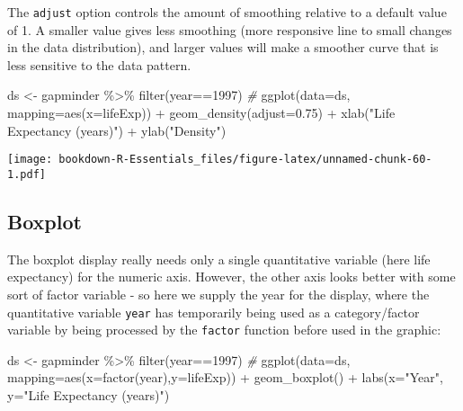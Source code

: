 \documentclass[
]{book}
\newenvironment{Shaded}{\begin{snugshade}}{\end{snugshade}}
\newcommand{\AttributeTok}[1]{\textcolor[rgb]{0.77,0.63,0.00}{#1}}
\newcommand{\CommentTok}[1]{\textcolor[rgb]{0.56,0.35,0.01}{\textit{#1}}}
\newcommand{\DecValTok}[1]{\textcolor[rgb]{0.00,0.00,0.81}{#1}}
\newcommand{\FloatTok}[1]{\textcolor[rgb]{0.00,0.00,0.81}{#1}}
\newcommand{\FunctionTok}[1]{\textcolor[rgb]{0.00,0.00,0.00}{#1}}
\newcommand{\NormalTok}[1]{#1}
\newcommand{\OtherTok}[1]{\textcolor[rgb]{0.56,0.35,0.01}{#1}}
\newcommand{\SpecialCharTok}[1]{\textcolor[rgb]{0.00,0.00,0.00}{#1}}
\newcommand{\StringTok}[1]{\textcolor[rgb]{0.31,0.60,0.02}{#1}}
\begin{document}
The \texttt{adjust} option controls the amount of smoothing relative to a default value of 1. A smaller value gives less smoothing (more responsive line to small changes in the data distribution), and larger values will make a smoother curve that is less sensitive to the data pattern.

\begin{Shaded}
\begin{Highlighting}[]
\NormalTok{ds }\OtherTok{\textless{}{-}}\NormalTok{ gapminder }\SpecialCharTok{\%\textgreater{}\%} 
  \FunctionTok{filter}\NormalTok{(year}\SpecialCharTok{==}\DecValTok{1997}\NormalTok{)}
\CommentTok{\#}
\FunctionTok{ggplot}\NormalTok{(}\AttributeTok{data=}\NormalTok{ds, }\AttributeTok{mapping=}\FunctionTok{aes}\NormalTok{(}\AttributeTok{x=}\NormalTok{lifeExp)) }\SpecialCharTok{+} 
  \FunctionTok{geom\_density}\NormalTok{(}\AttributeTok{adjust=}\FloatTok{0.75}\NormalTok{) }\SpecialCharTok{+} 
  \FunctionTok{xlab}\NormalTok{(}\StringTok{"Life Expectancy (years)"}\NormalTok{) }\SpecialCharTok{+}
  \FunctionTok{ylab}\NormalTok{(}\StringTok{"Density"}\NormalTok{)}
\end{Highlighting}
\end{Shaded}

\texttt{[image: bookdown-R-Essentials\_files/figure-latex/unnamed-chunk-60-1.pdf]}

\hypertarget{boxplot}{%
\subsection{Boxplot}\label{boxplot}}

The boxplot display really needs only a single quantitative variable (here life expectancy) for the numeric axis. However, the other axis looks better with some
sort of factor variable - so here we supply the year for the display, where the quantitative variable \texttt{year} has temporarily being used as a category/factor variable by being processed by the \texttt{factor} function before used in the graphic:

\begin{Shaded}
\begin{Highlighting}[]
\NormalTok{ds }\OtherTok{\textless{}{-}}\NormalTok{ gapminder }\SpecialCharTok{\%\textgreater{}\%} \FunctionTok{filter}\NormalTok{(year}\SpecialCharTok{==}\DecValTok{1997}\NormalTok{) }
\CommentTok{\#}
\FunctionTok{ggplot}\NormalTok{(}\AttributeTok{data=}\NormalTok{ds, }\AttributeTok{mapping=}\FunctionTok{aes}\NormalTok{(}\AttributeTok{x=}\FunctionTok{factor}\NormalTok{(year),}\AttributeTok{y=}\NormalTok{lifeExp)) }\SpecialCharTok{+}
 \FunctionTok{geom\_boxplot}\NormalTok{() }\SpecialCharTok{+} 
  \FunctionTok{labs}\NormalTok{(}\AttributeTok{x=}\StringTok{"Year"}\NormalTok{,}
       \AttributeTok{y=}\StringTok{"Life Expectancy (years)"}\NormalTok{)}
\end{Highlighting}
\end{Shaded}
\end{document}
